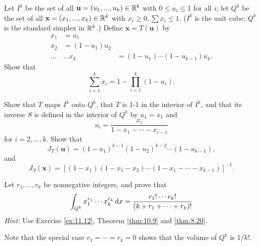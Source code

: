 \begin{myexercise}
    \label{ex:10.12}
    Let $I^k$ be the set of all $\mathbf{u} = (u_1, ... , u_k) \in {\protect\mathbb R}^k$ with $0 \leq u_i \leq 1$ for all $i$;
    let $Q^k$ be the set of all $\mathbf{x} = (x_1, ... , x_k) \in  {\protect\mathbb R}^k$ with $x_i \geq 0, \sum x_i \leq 1$.
    ($I^k$ is the unit cube;
    $Q^k$ is the standard simplex in ${\protect\mathbb R}^k$.)
    Define $\mathbf{x} = T(\mathbf{u})$ by
    \begin{align*}
        x_1   & = u_1                          \\
        x_2   & = (1-u_1)u_2                   \\
        \dots & \dots
        x_k   & = (1-u_1)\cdots(1-u_{k-1})u_k.
    \end{align*}
    Show that
    \begin{equation*}
        \sum_{i=1}^{k} x_i = 1 - \prod_{i=1}^{k} (1-u_i) .
    \end{equation*}

    Show that $T$ maps $I^k$ onto $Q^k$,
    that $T$ is 1-1 in the interior of $I^k$,
    and that its inverse $S$ is defined in the interior of $Q^k$ by $u_1 = x_1$ and
    \begin{equation*}
        u_i = \frac{x_i}{1-x_1-\cdots-x_{i-1}}
    \end{equation*}
    for $i=2,\dots,k$.
    Show that
    \begin{equation*}
        J_T(\mathbf{u}) =
        (1-u_1)^{k-1}
        (1-u_2)^{k-2}
        \cdots
        (1-u_{k-1}),
    \end{equation*}
    and
    \begin{equation*}
        J_S(\mathbf{x}) =
        \left[
            (1-x_1)
            (1-x_1-x_2)
            \cdots
            (1-x_1-\cdots-x_{k-1})
            \right]^{-1} .
    \end{equation*}
\end{myexercise}


\begin{myexercise}
    \label{ex:10.13}
    Let $r_1,\dots,r_k$ be nonnegative integers, and prove that
    \begin{equation*}
        \int_{Q^k}
        x_1^{r_1}
        \cdots
        x_k^{r_k}
        \d x =
        \frac{r_1!\cdots r_k!}{(k+r_1+\cdots+r_k)!}
    \end{equation*}
    \emph{Hint:} Use Exercise \ref{ex:11.12}, Theorem \ref{thm:10.9} and \ref{thm:8.20}.

    Note that the special case $r_1 = \cdots = r_k = 0$
    shows that the volume of $Q^k$ is $1/k!$.
\end{myexercise}


